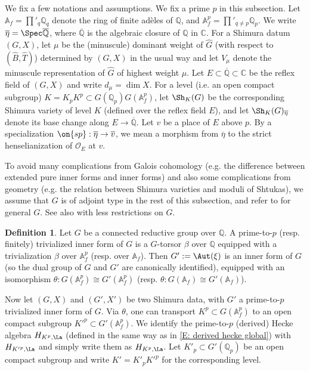 \documentclass[11pt]{amsart}
\theoremstyle{definition}
\theoremstyle{definition}
\theoremstyle{definition}
\newtheorem{dfn}[thm]{Definition}
\numberwithin{equation}{section}
\newcommand{\bA}{{\mathbb A}}
\newcommand{\bC}{{\mathbb C}}
\newcommand{\bQ}{{\mathbb Q}}
\newcommand{\mO}{{\mathcal O}}
\begin{document}
We fix a few notations and assumptions. We fix a prime $p$ in this subsection.
Let $\bA_f=\prod'_q\bQ_q$ denote the ring of finite ad\`eles of $\bQ$, and $\bA_f^p=\prod'_{q\neq p}\bQ_p$.  We write $\overline\eta=\Spec \overline{\bQ}$, where $\overline{\bQ}$ is the algebraic closure of $\bQ$ in $\bC$. For a Shimura datum $(G,X)$, let $\mu$ be the (minuscule) dominant weight of $\hat{G}$ (with respect to $(\hat{B},\hat{T})$) determined by $(G,X)$ in the usual way and let $V_\mu$ denote the minuscule representation of $\hat{G}$ of highest weight $\mu$. Let $E\subset\overline{\bQ}\subset\bC$ be the reflex field of $(G,X)$ and write $d_\mu=\dim X$.
For a level (i.e. an open compact subgroup) $K=K_pK^p\subset G(\bQ_p)G(\bA_f^p)$,
let $\Sh_K(G)$ be the corresponding Shimura variety of level $K$ (defined over the reflex field $E$), and let $\Sh_K(G)_{\overline\eta}$ denote its base change along $E\to \overline\bQ$.
Let $v$ be a place of $E$ above $p$. By a specialization $\on{sp}: \overline\eta\to \overline{v}$, we mean a morphism from $\overline\eta$ to the strict henselianization of $\mO_E$ at $v$.
 
To avoid many complications from Galois cohomology (e.g. the difference between extended pure inner forms and inner forms) 
and also some complications from geometry (e.g. the relation between Shimura varieties and moduli of Shtukas), we assume that $G$ is of adjoint type in the rest of this subsection, and refer to \cite{Xiao-Zhu-Cycle} for general $G$. See also \cite{Zhu-Conjecture} with less restrictions on $G$.

\begin{dfn}\label{D: prime-to-p trivial}
Let $G$ be a connected reductive group over $\bQ$. A prime-to-$p$ (resp. finitely) trivialized inner form of $G$ is a $G$-torsor $\beta$ over $\bQ$ equipped with a trivialization $\beta$ over $\bA_f^p$ (resp. over $\bA_f$).
Then $G':=\Aut(\xi)$ is an inner form of $G$ (so the dual group of $G$ and $G'$ are canonically identified), equipped with an isomorphism $\theta: G(\bA^p_f)\cong G'(\bA^p_f)$ (resp. $\theta: G(\bA_f)\cong G'(\bA_f)$).
\end{dfn}

Now let $(G,X)$ and $(G',X')$ be two Shimura data, with $G'$ a prime-to-$p$ trivialized inner form of $G$.
Via $\theta$, one can transport $K^p\subset G(\bA_f^p)$ to an open compact subgroup ${K'}^p\subset G'(\bA_f^p)$. We identify the prime-to-$p$ (derived) Hecke algebra 
$H_{K^p,\La}$ (defined in the same way as in \eqref{E: derived hecke global}) with $H_{{K'}^p,\La}$ and simply write them as $H_{K^p,\La}$.
Let $K'_p\subset G'(\bQ_p)$ be an open compact subgroup and write $K'=K'_p{K'}^p$ for the corresponding level. 
\end{document}
